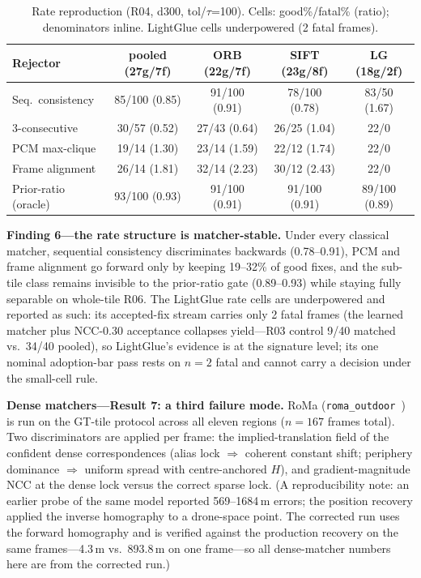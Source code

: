 \documentclass[journal]{IEEEtran}
\begin{document}
\begin{table}[t]
\caption{Rate reproduction (R04, d300, tol/$\tau$=100). Cells: good\%/fatal\% (ratio); denominators inline. LightGlue cells underpowered (2 fatal frames).}
\label{tab:matcherrate}
\centering
\footnotesize
\setlength{\tabcolsep}{3.5pt}
\begin{tabular}{@{}lcccc@{}}
\toprule
Rejector & pooled (27g/7f) & ORB (22g/7f) & SIFT (23g/8f) & LG (18g/2f) \\
\midrule
Seq.\ consistency & 85/100 (0.85) & 91/100 (0.91) & 78/100 (0.78) & 83/50 (1.67) \\
3-consecutive & 30/57 (0.52) & 27/43 (0.64) & 26/25 (1.04) & 22/0 \\
PCM max-clique & 19/14 (1.30) & 23/14 (1.59) & 22/12 (1.74) & 22/0 \\
Frame alignment & 26/14 (1.81) & 32/14 (2.23) & 30/12 (2.43) & 22/0 \\
Prior-ratio (oracle) & 93/100 (0.93) & 91/100 (0.91) & 91/100 (0.91) & 89/100 (0.89) \\
\bottomrule
\end{tabular}
\end{table}

\textbf{Finding 6---the rate structure is matcher-stable.} Under every classical matcher, sequential consistency discriminates backwards (0.78--0.91), PCM and frame alignment go forward only by keeping 19--32\% of good fixes, and the sub-tile class remains invisible to the prior-ratio gate (0.89--0.93) while staying fully separable on whole-tile R06. The LightGlue rate cells are underpowered and reported as such: its accepted-fix stream carries only 2 fatal frames (the learned matcher plus NCC-0.30 acceptance collapses yield---R03 control 9/40 matched vs.\ 34/40 pooled), so LightGlue's evidence is at the signature level; its one nominal adoption-bar pass rests on $n=2$ fatal and cannot carry a decision under the small-cell rule.

\textbf{Dense matchers---Result 7: a third failure mode.} RoMa (\texttt{roma\_outdoor}~\cite{roma}) is run on the GT-tile protocol across all eleven regions ($n=167$ frames total). Two discriminators are applied per frame: the implied-translation field of the confident dense correspondences (alias lock $\Rightarrow$ coherent constant shift; periphery dominance $\Rightarrow$ uniform spread with centre-anchored $H$), and gradient-magnitude NCC at the dense lock versus the correct sparse lock. (A reproducibility note: an earlier probe of the same model reported 569--1684\,m errors; the position recovery applied the inverse homography to a drone-space point. The corrected run uses the forward homography and is verified against the production recovery on the same frames---4.3\,m vs.\ 893.8\,m on one frame---so all dense-matcher numbers here are from the corrected run.)
\end{document}
